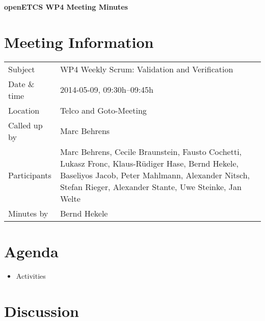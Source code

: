 \documentclass[a4paper, 11pt]{article}
\begin{document}
{\begin{center}\huge\bf openETCS WP4 Meeting Minutes\end{center}}
\section{Meeting Information}

\renewcommand{\arraystretch}{1.5}
\begin{supertabular}{m{.2\textwidth}m{.8\textwidth}}
Subject & WP4 Weekly Scrum: Validation and Verification\\
Date \& time & 2014-05-09, 09:30h--09:45h\\
Location & Telco and Goto-Meeting\\
Called up by & Marc Behrens\\
Participants &
Marc Behrens,
Cecile Braunstein,
Fausto Cochetti,
Lukasz Fronc,
Klaus-R\"udiger Hase,
Bernd Hekele,
Baseliyos Jacob,
Peter Mahlmann,
Alexander Nitsch,
Stefan Rieger,
Alexander Stante,
Uwe Steinke,
Jan Welte
\\

Minutes by & Bernd Hekele\\

\end{supertabular}
\renewcommand{\arraystretch}{1.0}


\section{{Agenda}}
\begin{itemize}
\item Activities
\end{itemize}

\section{Discussion}
\end{document}
